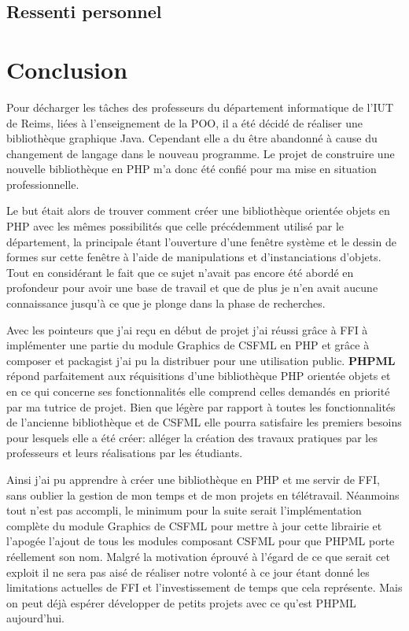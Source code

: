 \documentclass[11pt,a4paper,krantz2,11pt,oneside]{krantz}
\begin{document}
\hypertarget{ressenti-personnel}{%
\section{Ressenti personnel}\label{ressenti-personnel}}

\hypertarget{conclusion}{%
\chapter*{Conclusion}\label{conclusion}}


Pour décharger les tâches des professeurs du département informatique de l'IUT de Reims, liées à l'enseignement de la POO, il a été décidé de réaliser une bibliothèque graphique Java. Cependant elle a du être abandonné à cause du changement de langage dans le nouveau programme. Le projet de construire une nouvelle bibliothèque en PHP m'a donc été confié pour ma mise en situation professionnelle.

Le but était alors de trouver comment créer une bibliothèque orientée objets en PHP avec les mêmes possibilités que celle précédemment utilisé par le département, la principale étant l'ouverture d'une fenêtre système et le dessin de formes sur cette fenêtre à l'aide de manipulations et d'instanciations d'objets. Tout en considérant le fait que ce sujet n'avait pas encore été abordé en profondeur pour avoir une base de travail et que de plus je n'en avait aucune connaissance jusqu'à ce que je plonge dans la phase de recherches.

Avec les pointeurs que j'ai reçu en début de projet j'ai réussi grâce à FFI à implémenter une partie du module Graphics de CSFML en PHP et grâce à composer et packagist j'ai pu la distribuer pour une utilisation public. \textbf{PHPML} répond parfaitement aux réquisitions d'une bibliothèque PHP orientée objets et en ce qui concerne ses fonctionnalités elle comprend celles demandés en priorité par ma tutrice de projet. Bien que légère par rapport à toutes les fonctionnalités de l'ancienne bibliothèque et de CSFML elle pourra satisfaire les premiers besoins pour lesquels elle a été créer: alléger la création des travaux pratiques par les professeurs et leurs réalisations par les étudiants.

Ainsi j'ai pu apprendre à créer une bibliothèque en PHP et me servir de FFI, sans oublier la gestion de mon temps et de mon projets en télétravail. Néanmoins tout n'est pas accompli, le minimum pour la suite serait l'implémentation complète du module Graphics de CSFML pour mettre à jour cette librairie et l'apogée l'ajout de tous les modules composant CSFML pour que PHPML porte réellement son nom. Malgré la motivation éprouvé à l'égard de ce que serait cet exploit il ne sera pas aisé de réaliser notre volonté à ce jour étant donné les limitations actuelles de FFI et l'investissement de temps que cela représente. Mais on peut déjà espérer développer de petits projets avec ce qu'est PHPML aujourd'hui.
\end{document}
